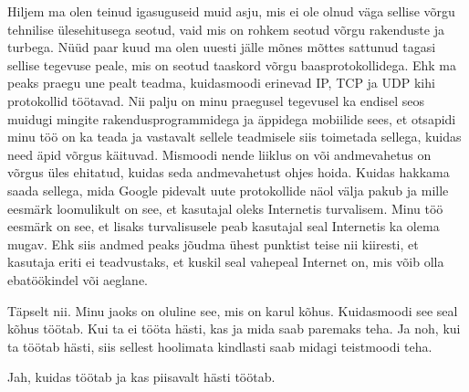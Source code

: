 Hiljem ma olen teinud igasuguseid muid asju, mis ei ole olnud väga sellise 
võrgu tehnilise ülesehitusega seotud, vaid mis on rohkem seotud võrgu 
rakenduste ja turbega. Nüüd paar kuud ma olen uuesti jälle mõnes mõttes 
sattunud tagasi sellise tegevuse peale, mis on seotud taaskord võrgu 
baasprotokollidega. Ehk  ma peaks praegu une pealt teadma, kuidasmoodi erinevad 
IP,  TCP  ja UDP kihi protokollid töötavad. Nii palju on minu praegusel 
tegevusel ka endisel seos muidugi mingite rakendusprogrammidega ja äppidega  
mobiilide sees, et otsapidi minu töö on ka teada ja vastavalt sellele 
teadmisele siis toimetada sellega, kuidas need äpid võrgus käituvad. Mismoodi 
nende liiklus on või  andmevahetus on võrgus üles ehitatud, kuidas seda 
andmevahetust ohjes hoida. Kuidas hakkama saada sellega, 
mida Google pidevalt uute protokollide näol välja pakub ja mille eesmärk 
loomulikult on see, et kasutajal oleks Internetis turvalisem. Minu töö eesmärk on 
see, et lisaks turvalisusele peab kasutajal seal Internetis ka olema mugav. Ehk 
siis andmed peaks jõudma ühest punktist teise nii kiiresti, et kasutaja 
eriti ei teadvustaks, et  kuskil seal vahepeal Internet on, mis võib olla ebatöökindel või 
aeglane.


Täpselt nii. Minu jaoks on oluline see, mis on karul kõhus. Kuidasmoodi see 
seal kõhus töötab. Kui ta ei tööta hästi, kas ja mida  saab paremaks teha. Ja 
noh, kui ta töötab hästi, siis  sellest hoolimata kindlasti saab midagi 
teistmoodi teha.


Jah, kuidas töötab ja kas piisavalt hästi töötab.
